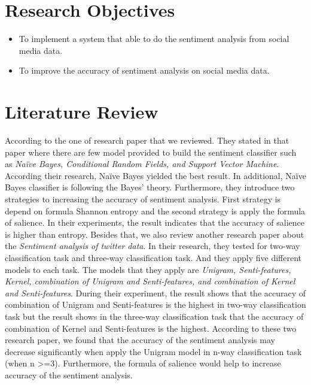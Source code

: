 \documentclass[a4paper,12pt]{article}
\begin{document}
\section{Research Objectives}
\begin{itemize}
\item To implement a system that able to do the sentiment analysis from social media data.
\item To improve the accuracy of sentiment analysis on social media data.
\end{itemize}
\section{Literature Review}
\hspace{1cm}According to the one of research paper that we reviewed\cite{APPP2010}. They stated in that paper where there are few model provided to build the sentiment classifier such as \textit{Naïve Bayes, Conditional Random Fields, and Support Vector Machine\cite{Pang2002}}. According their research, Naïve Bayes yielded the best result. In additional, Naïve Bayes classifier is following the Bayes’ theory. Furthermore, they introduce two strategies to increasing the accuracy of sentiment analysis. First strategy is depend on formula Shannon entropy and the second strategy is apply the formula of salience. In their experiments, the result indicates that the accuracy of salience is higher than entropy. Besides that, we also review another research paper about the \textit{Sentiment analysis of twitter data}\cite{SentAnaly2011}. In their research, they tested for two-way classification task and three-way classification task. And they apply five different models to each task. The models that they apply are \textit{Unigram, Senti-features, Kernel, combination of Unigram and Senti-features, and combination of Kernel and Senti-features}. During their experiment, the result shows that the accuracy of combination of Unigram and Senti-features is the highest in two-way classification task but the result shows in the three-way classification task that the accuracy of combination of Kernel and Senti-features is the highest. According to these two research paper, we found that the accuracy of the sentiment analysis may decrease significantly when apply the Unigram model in n-way classification task (when n \textgreater =3). Furthermore, the formula of salience would help to increase accuracy of the sentiment analysis. 
\end{document}
